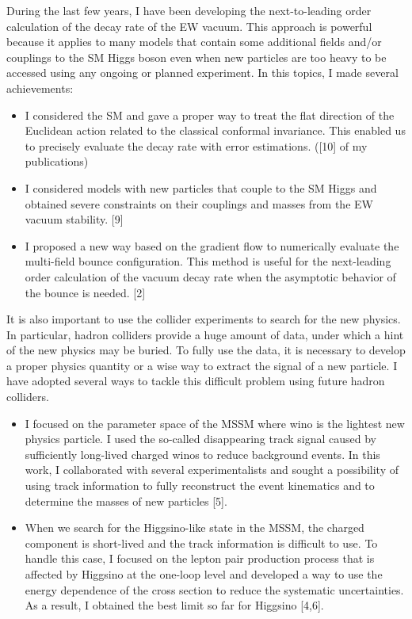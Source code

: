 \documentclass[12pt,notitlepage]{article}
\begin{document}
During the last few years, I have been developing the next-to-leading order calculation of the decay rate of the EW vacuum.
This approach is powerful because it applies to many models that contain some additional fields and/or couplings to the SM Higgs boson even when new particles are too heavy to be accessed using any ongoing or planned experiment.
In this topics, I made several achievements:
\vspace{-1.3mm}
\begin{itemize}
  \setlength{\parskip}{0mm}
  \setlength{\itemsep}{1mm}
  \item
    I considered the SM and gave a proper way to treat the flat direction of the Euclidean action related to the classical conformal invariance.
    This enabled us to precisely evaluate the decay rate with error estimations. ([10] of my publications)
  \item
    I considered models with new particles that couple to the SM Higgs and obtained severe constraints on their couplings and masses from the EW vacuum stability. [9]
  \item
    I proposed a new way based on the gradient flow to numerically evaluate the multi-field bounce configuration.
    This method is useful for the next-leading order calculation of the vacuum decay rate when the asymptotic behavior of the bounce is needed. [2]
\end{itemize}

It is also important to use the collider experiments to search for the new physics.
In particular, hadron colliders provide a huge amount of data, under which a hint of the new physics may be buried.
To fully use the data, it is necessary to develop a proper physics quantity or a wise way to extract the signal of a new particle.
I have adopted several ways to tackle this difficult problem using future hadron colliders.
\vspace{-1.3mm}
\begin{itemize}
  \setlength{\parskip}{0mm}
  \setlength{\itemsep}{1mm}
  \item
    I focused on the parameter space of the MSSM where wino is the lightest new physics particle.
    I used the so-called disappearing track signal caused by sufficiently long-lived charged winos to reduce background events.
    In this work, I collaborated with several experimentalists and sought a possibility of using track information to fully reconstruct the event kinematics and to determine the masses of new particles [5].
  \item
    When we search for the Higgsino-like state in the MSSM, the charged component is short-lived and the track information is difficult to use.
    To handle this case, I focused on the lepton pair production process that is affected by Higgsino at the one-loop level and developed a way to use the energy dependence of the cross section to reduce the systematic uncertainties.
    As a result, I obtained the best limit so far for Higgsino [4,6].
\end{itemize}
\end{document}
